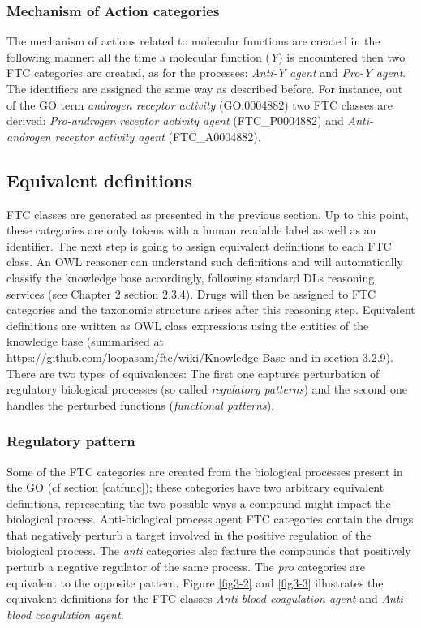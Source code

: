 \subsubsection{Mechanism of Action categories}
The mechanism of actions related to molecular functions are created in the following manner: all the time a molecular function (\emph{Y}) is encountered then two FTC categories are created, as for the processes: \emph{Anti-Y agent} and \emph{Pro-Y agent}. The identifiers are assigned the same way as described before. For instance, out of the GO term \emph{androgen receptor activity} (GO:0004882) two FTC classes are derived: \emph{Pro-androgen receptor activity agent} (FTC\_P0004882) and \emph{Anti-androgen receptor activity agent} (FTC\_A0004882).

\subsection{Equivalent definitions}
FTC classes are generated as presented in the previous section. Up to this point, these categories are only tokens with a human readable label as well as an identifier. The next step is going to assign equivalent definitions to each FTC class. An OWL reasoner can understand such definitions and will automatically classify the knowledge base accordingly, following standard DLs reasoning services (see Chapter 2 section 2.3.4).
Drugs will then be assigned to FTC categories and the taxonomic structure arises after this reasoning step. Equivalent definitions are written as OWL class expressions using the entities of the knowledge base (summarised at \url{https://github.com/loopasam/ftc/wiki/Knowledge-Base} and in section 3.2.9). There are two types of equivalences: The first one captures perturbation of regulatory biological processes (so called \emph{regulatory patterns}) and the second one handles the perturbed functions (\emph{functional patterns}).

\subsubsection{Regulatory pattern}
Some of the FTC categories are created from the biological processes present in the GO (cf section \ref{catfunc}); these categories have two arbitrary equivalent definitions, representing the two possible ways a compound might impact the biological process. Anti-biological process agent FTC categories contain the drugs that negatively perturb a target involved in the positive regulation of the biological process. The \emph{anti} categories also feature the compounds that positively perturb a negative regulator of the same process. The \emph{pro} categories are equivalent to the opposite pattern. Figure \ref{fig3-2} and \ref{fig3-3} illustrates the equivalent definitions for the FTC classes \emph{Anti-blood coagulation agent} and \emph{Anti-blood coagulation agent}.

